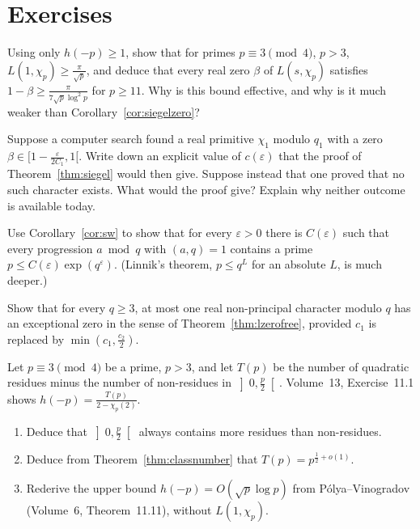 \section{Exercises}

\begin{exercise}[$\star$]\label{ex:hge1}
Using only $h(-p)\ge1$, show that for primes $p\equiv3\pmod4$, $p>3$, $L(1,\chi_p)\ge\frac\pi{\sqrt p}$, and deduce that every real zero $\beta$ of $L(s,\chi_p)$ satisfies $1-\beta\ge\frac\pi{7\sqrt p\log^2p}$ for $p\ge11$. Why is this bound effective, and why is it much weaker than Corollary~\ref{cor:siegelzero}?
\end{exercise}

\begin{exercise}[$\star$]\label{ex:ineffective}
Suppose a computer search found a real primitive $\chi_1$ modulo $q_1$ with a zero $\beta\in\bigl[1-\frac\varepsilon{2C_1},1\bigr[$. Write down an explicit value of $c(\varepsilon)$ that the proof of Theorem~\ref{thm:siegel} would then give. Suppose instead that one proved that no such character exists. What would the proof give? Explain why neither outcome is available today.
\end{exercise}

\begin{exercise}[$\star\star$]\label{ex:leastprime}
Use Corollary~\ref{cor:sw} to show that for every $\varepsilon>0$ there is $C(\varepsilon)$ such that every progression $a\bmod q$ with $(a,q)=1$ contains a prime $p\le C(\varepsilon)\exp(q^\varepsilon)$. (Linnik's theorem, $p\le q^L$ for an absolute $L$, is much deeper.)
\end{exercise}

\begin{exercise}[$\star\star$]\label{ex:onebad}
Show that for every $q\ge3$, at most one real non-principal character modulo $q$ has an exceptional zero in the sense of Theorem~\ref{thm:lzerofree}, provided $c_1$ is replaced by $\min(c_1,\frac{c_2}2)$.
\end{exercise}

\begin{exercise}[$\star\star$]\label{ex:hupper}
Let $p\equiv3\pmod4$ be a prime, $p>3$, and let $T(p)$ be the number of quadratic residues minus the number of non-residues in $\left]0,\frac p2\right[$. Volume~13, Exercise~11.1 shows $h(-p)=\frac{T(p)}{2-\chi_p(2)}$.
\begin{enumerate}
\item Deduce that $\left]0,\frac p2\right[$ always contains more residues than non-residues.
\item Deduce from Theorem~\ref{thm:classnumber} that $T(p)=p^{\frac12+o(1)}$.
\item Rederive the upper bound $h(-p)=O(\sqrt p\log p)$ from Pólya--Vinogradov (Volume~6, Theorem~11.11), without $L(1,\chi_p)$.
\end{enumerate}
\end{exercise}


